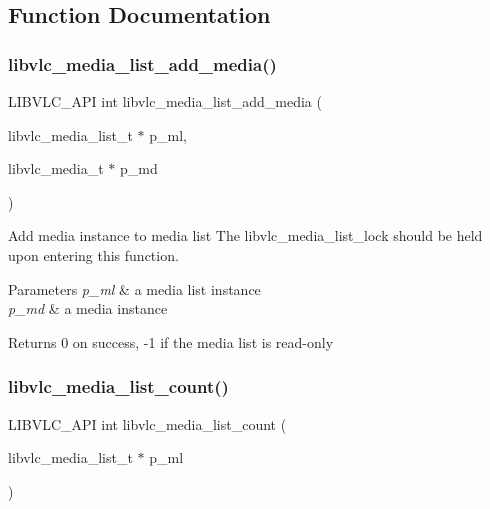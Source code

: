 \subsection{Function Documentation}
\mbox{\label{group__libvlc__media__list_gab1dea4f59a23ee3e151a34704f2b8bc5}} 
\subsubsection{\texorpdfstring{libvlc\+\_\+media\+\_\+list\+\_\+add\+\_\+media()}{libvlc\_media\_list\_add\_media()}}
{\footnotesize\ttfamily L\+I\+B\+V\+L\+C\+\_\+\+A\+PI int libvlc\+\_\+media\+\_\+list\+\_\+add\+\_\+media (\begin{DoxyParamCaption}\item[{libvlc\+\_\+media\+\_\+list\+\_\+t $\ast$}]{p\+\_\+ml,  }\item[{libvlc\+\_\+media\+\_\+t $\ast$}]{p\+\_\+md }\end{DoxyParamCaption})}

Add media instance to media list The libvlc\+\_\+media\+\_\+list\+\_\+lock should be held upon entering this function.


\begin{DoxyParams}{Parameters}
{\em p\+\_\+ml} & a media list instance \\
\hline
{\em p\+\_\+md} & a media instance \\
\hline
\end{DoxyParams}
\begin{DoxyReturn}{Returns}
0 on success, -\/1 if the media list is read-\/only 
\end{DoxyReturn}
\mbox{\label{group__libvlc__media__list_ga91adfaf535ae4a6338a53865f45444d7}} 
\subsubsection{\texorpdfstring{libvlc\+\_\+media\+\_\+list\+\_\+count()}{libvlc\_media\_list\_count()}}
{\footnotesize\ttfamily L\+I\+B\+V\+L\+C\+\_\+\+A\+PI int libvlc\+\_\+media\+\_\+list\+\_\+count (\begin{DoxyParamCaption}\item[{libvlc\+\_\+media\+\_\+list\+\_\+t $\ast$}]{p\+\_\+ml }\end{DoxyParamCaption})}

